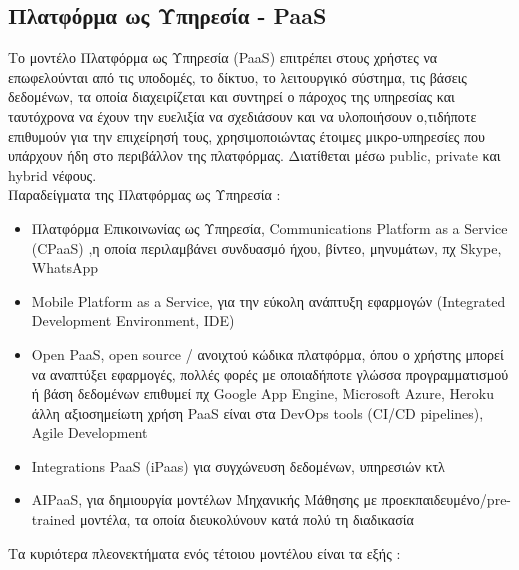 \documentclass{article}
\begin{document}
\subsection{Πλατφόρμα ως Υπηρεσία - PaaS}
Το μοντέλο Πλατφόρμα ως Υπηρεσία (PaaS) επιτρέπει στους χρήστες να επωφελούνται από τις υποδομές, το δίκτυο, το λειτουργικό σύστημα, τις βάσεις δεδομένων, τα οποία διαχειρίζεται και συντηρεί ο πάροχος της υπηρεσίας και ταυτόχρονα να έχουν την ευελιξία να σχεδιάσουν και να υλοποιήσουν ο,τιδήποτε επιθυμούν για την επιχείρησή τους, χρησιμοποιώντας έτοιμες μικρο-υπηρεσίες που υπάρχουν ήδη στο περιβάλλον της πλατφόρμας. Διατίθεται μέσω  public, private και hybrid νέφους. \\
Παραδείγματα της Πλατφόρμας ως Υπηρεσία :
\begin{itemize}
\item Πλατφόρμα Επικοινωνίας ως Υπηρεσία, Communications Platform as a Service    (CPaaS) ,η οποία περιλαμβάνει συνδυασμό ήχου, βίντεο, μηνυμάτων, πχ Skype, WhatsApp
\item Mobile Platform as a Service, για την εύκολη ανάπτυξη εφαρμογών (Integrated Development Environment, IDE)
\item Open PaaS, open source / ανοιχτού κώδικα πλατφόρμα, όπου ο χρήστης μπορεί να αναπτύξει εφαρμογές, πολλές φορές με οποιαδήποτε γλώσσα προγραμματισμού ή βάση δεδομένων επιθυμεί πχ Google App Engine, Microsoft Azure, Heroku
 άλλη αξιοσημείωτη χρήση PaaS είναι στα DevOps tools (CI/CD pipelines), Agile Development
\item Integrations PaaS (iPaas) για συγχώνευση δεδομένων, υπηρεσιών κτλ
\item {}AIPaaS, για δημιουργία μοντέλων Μηχανικής Μάθησης με προεκπαιδευμένο/pre-trained μοντέλα, τα οποία διευκολύνουν κατά πολύ τη διαδικασία 
\end{itemize}
Τα κυριότερα πλεονεκτήματα ενός τέτοιου μοντέλου είναι τα εξής :
\end{document}
